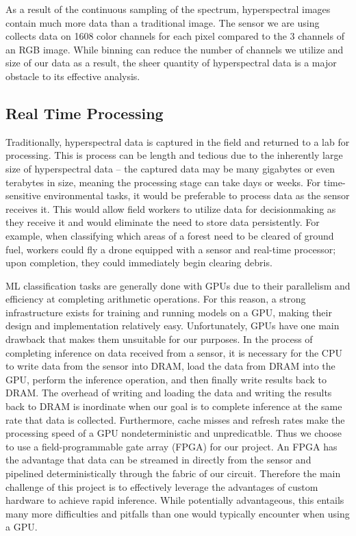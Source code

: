 \documentclass{article}
\newcommand{\mycomment}[1]{}
\begin{document}
As a result of the continuous sampling of the spectrum, hyperspectral images contain much more data than a traditional image. The sensor we are using collects data on 1608 color channels for each pixel compared to the 3 channels of an RGB image. While binning can reduce the number of channels we utilize and size of our data as a result, the sheer quantity of hyperspectral data is a major obstacle to its effective analysis.

\subsection{Real Time Processing}
Traditionally, hyperspectral data is captured in the field and returned to a lab for processing. This is process can be length and tedious due to the inherently large size of hyperspectral data -- the captured data may be many gigabytes or even terabytes in size, meaning the processing stage can take days or weeks.\mycomment{Note: is this true??} For time-sensitive environmental tasks, it would be preferable to process data as the sensor receives it. This would allow field workers to utilize data for decisionmaking as they receive it and would eliminate the need to store data persistently. For example, when classifying which areas of a forest need to be cleared of ground fuel, workers could fly a drone equipped with a sensor and real-time processor; upon completion, they could immediately begin clearing debris.

ML classification tasks are generally done with GPUs due to their parallelism and efficiency at completing arithmetic operations. For this reason, a strong infrastructure exists for training and running models on a GPU, making their design and implementation relatively easy. Unfortunately, GPUs have one main drawback that makes them unsuitable for our purposes. In the process of completing inference on data received from a sensor, it is necessary for the CPU to write data from the sensor into DRAM, load the data from DRAM into the GPU, perform the inference operation, and then finally write results back to DRAM. The overhead of writing and loading the data and writing the results back to DRAM is inordinate when our goal is to complete inference at the same rate that data is collected. Furthermore, cache misses and refresh rates make the processing speed of a GPU nondeterministic and unpredicatble. Thus we choose to use a field-programmable gate array (FPGA) for our project. An FPGA has the advantage that data can be streamed in directly from the sensor and pipelined deterministically through the fabric of our circuit. Therefore the main challenge of this project is to effectively leverage the advantages of custom hardware to achieve rapid inference. While potentially advantageous, this entails many more difficulties and pitfalls than one would typically encounter when using a GPU.
\end{document}
